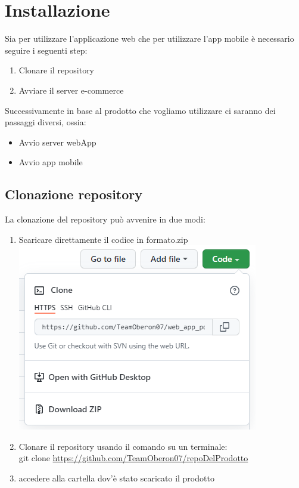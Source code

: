 \section{Installazione}
Sia per utilizzare l’applicazione web che per utilizzare l'app mobile è necessario seguire i seguenti step:
\begin{enumerate}
    \item Clonare il repository
    \item Avviare il server e-commerce
\end{enumerate}

Successivamente in base al prodotto che vogliamo utilizzare ci saranno dei passaggi diversi, ossia:

\begin{itemize}
    \item Avvio server webApp
    \item Avvio app mobile
\end{itemize}

\subsection{Clonazione repository}
La clonazione del repository può avvenire in due modi:
\begin{enumerate}
    \item Scaricare direttamente il codice in formato.zip\\
    \includegraphics[scale = 0.5]{img/githubclone.PNG}
    \item Clonare il repository usando il comando su un terminale:\\
    git clone \href{https://github.com/TeamOberon07/web_app_poc.git}{https://github.com/TeamOberon07/repoDelProdotto}
    
    \item accedere alla cartella dov'è stato scaricato il prodotto
\end{enumerate}
